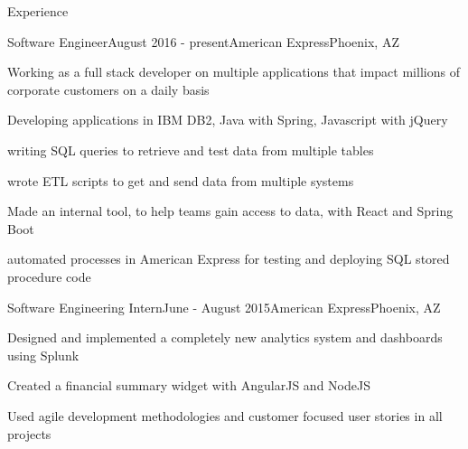 \documentclass{resume} %
\begin{document}
\begin{rSection}{Experience}

\begin{rSubsection}{Software Engineer}{August 2016 - present}{American Express}{Phoenix, AZ}
\item Working as a full stack developer on multiple applications that impact millions of corporate customers on a daily basis
\item Developing applications in IBM DB2, Java with Spring, Javascript with jQuery
\item writing SQL queries to retrieve and test data from multiple tables
\item wrote ETL scripts to get and send data from multiple systems
\item Made an internal tool, to help teams gain access to data, with React and Spring Boot
\item automated processes in American Express for testing and deploying SQL stored procedure code
\end{rSubsection}

\begin{rSubsection}{Software Engineering Intern}{June - August 2015}{American Express}{Phoenix, AZ}
\item Designed and implemented a completely new analytics system and dashboards using Splunk 
\item Created a financial summary widget with AngularJS and NodeJS 
\item Used agile development methodologies and customer focused user stories in all projects
\end{rSubsection}






\end{rSection}
\end{document}
